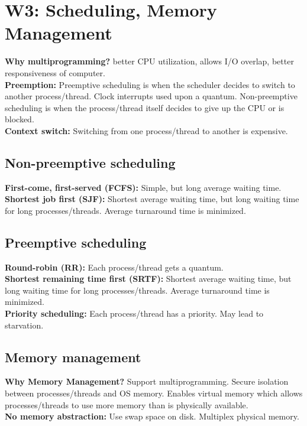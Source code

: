 \section{W3: Scheduling, Memory Management}
\textbf{Why multiprogramming?} better CPU utilization, allows I/O overlap, better responsiveness of computer.\\
\textbf{Preemption:} Preemptive scheduling is when the scheduler decides to switch to another process/thread. Clock interrupts used upon a quantum. Non-preemptive scheduling is when the process/thread itself decides to give up the CPU or is blocked.\\
\textbf{Context switch:} Switching from one process/thread to another is expensive.\\

\subsection{Non-preemptive scheduling}
\textbf{First-come, first-served (FCFS):} Simple, but long average waiting time.\\
\textbf{Shortest job first (SJF):} Shortest average waiting time, but long waiting time for long processes/threads. Average turnaround time is minimized.\\

\subsection{Preemptive scheduling}
\textbf{Round-robin (RR):} Each process/thread gets a quantum.\\
\textbf{Shortest remaining time first (SRTF):} Shortest average waiting time, but long waiting time for long processes/threads. Average turnaround time is minimized.\\
\textbf{Priority scheduling:} Each process/thread has a priority. May lead to starvation.\\

\subsection{Memory management}
\textbf{Why Memory Management?} Support multiprogramming. Secure isolation between processes/threads and OS memory. Enables virtual memory which allows processes/threads to use more memory than is physically available.\\
\textbf{No memory abstraction:} Use swap space on disk. Multiplex physical memory.\\


